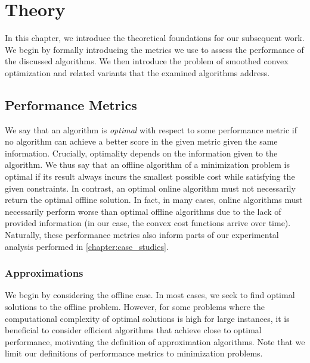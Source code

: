 
\chapter{Theory}\label{chapter:theory}

In this chapter, we introduce the theoretical foundations for our subsequent work. We begin by formally introducing the metrics we use to assess the performance of the discussed algorithms. We then introduce the problem of smoothed convex optimization and related variants that the examined algorithms address.

\section{Performance Metrics}\label{section:theory:performance_metrics}

We say that an algorithm is \emph{optimal} with respect to some performance metric if no algorithm can achieve a better score in the given metric given the same information. Crucially, optimality depends on the information given to the algorithm. We thus say that an offline algorithm of a minimization problem is optimal if its result always incurs the smallest possible cost while satisfying the given constraints. In contrast, an optimal online algorithm must not necessarily return the optimal offline solution. In fact, in many cases, online algorithms must necessarily perform worse than optimal offline algorithms due to the lack of provided information (in our case, the convex cost functions arrive over time). Naturally, these performance metrics also inform parts of our experimental analysis performed in \cref{chapter:case_studies}.

\subsection{Approximations}

We begin by considering the offline case. In most cases, we seek to find optimal solutions to the offline problem. However, for some problems where the computational complexity of optimal solutions is high for large instances, it is beneficial to consider efficient algorithms that achieve close to optimal performance, motivating the definition of approximation algorithms. Note that we limit our definitions of performance metrics to minimization problems.

